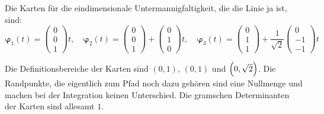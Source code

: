 \documentclass[11pt, ngerman, fleqn]{article}
\renewcommand{\vec}[1]{\boldsymbol{#1}}
\begin{document}
Die Karten für die eindimensionale Untermannigfaltigkeit, die die Linie ja ist, sind:
\[
	\vec\varphi_1(t) = \begin{pmatrix}
		0 \\ 0 \\ 1
	\end{pmatrix} t
	,\quad
	\vec\varphi_2(t) = \begin{pmatrix}
		0 \\ 0 \\ 1
	\end{pmatrix} + \begin{pmatrix}
		0 \\ 1 \\ 0
	\end{pmatrix} t
	,\quad
	\vec\varphi_3(t) = \begin{pmatrix}
		0 \\ 1 \\ 1
	\end{pmatrix} + \frac{1}{\sqrt{2}} \begin{pmatrix}
		0 \\ -1 \\ -1
	\end{pmatrix} t
\]

Die Definitionsbereiche der Karten sind $(0, 1)$, $(0, 1)$ und $\intoo{0, \sqrt{2}}$. Die Randpunkte, die eigentlich zum Pfad noch dazu gehören sind eine Nullmenge und machen bei der Integration keinen Unterschied. Die gramschen Determinanten der Karten sind allesamt $1$.
\end{document}
